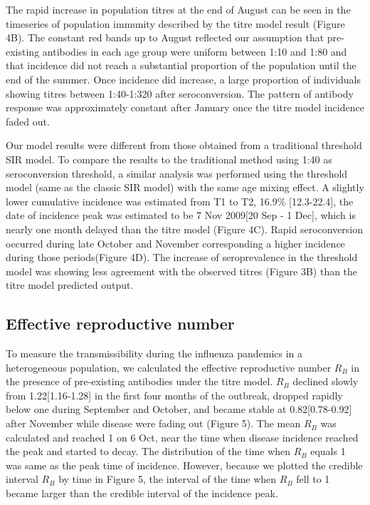 \documentclass{article}
\begin{document}
The rapid increase in population titres at the end of August can be seen in the timeseries of population immunity described by the titre model result (Figure 4B). The constant red bands up to August reflected our assumption that pre-existing antibodies in each age group were uniform between 1:10 and 1:80 and that incidence did not reach a substantial proportion of the population until the end of the summer. Once incidence did increase, a large proportion of individuals showing titres between 1:40-1:320 after seroconversion. The pattern of antibody response was approximately constant after January once the titre model incidence faded out.

Our model results were different from those obtained from a traditional threshold SIR model. To compare the results to the traditional method using 1:40 as seroconversion threshold, a similar analysis was performed using the threshold model (same as the classic SIR model) with the same age mixing effect. A slightly lower cumulative incidence was estimated from T1 to T2, 16.9\% [12.3-22.4], the date of incidence peak was estimated to be 7 Nov 2009[20 Sep - 1 Dec], which is nearly one month delayed than the titre model (Figure 4C). Rapid seroconversion occurred during late October and November corresponding a higher incidence during those periods(Figure 4D). The increase of seroprevalence in the threshold model was showing less agreement with the observed titres (Figure 3B) than the titre model predicted output. 
 
\subsection{Effective reproductive number}
To measure the transmissibility during the influenza pandemics in a heterogeneous population, we calculated the effective reproductive number $R_{B}$ in the presence of pre-existing antibodies under the titre model. $R_{B}$ declined slowly from 1.22[1.16-1.28] in the first four months of the outbreak, dropped rapidly below one during September and October, and became stable at 0.82[0.78-0.92] after November while disease were fading out (Figure 5). The mean $R_{B}$ was calculated and reached 1 on 6 Oct, near the time when disease incidence reached the peak and started to decay. The distribution of the time when $R_{B}$ equals 1 was same as the peak time of incidence. However, because we plotted the credible interval $R_{B}$ by time in Figure 5, the interval of the time when $R_{B}$ fell to 1 became larger than the credible interval of the incidence peak.
\end{document}
